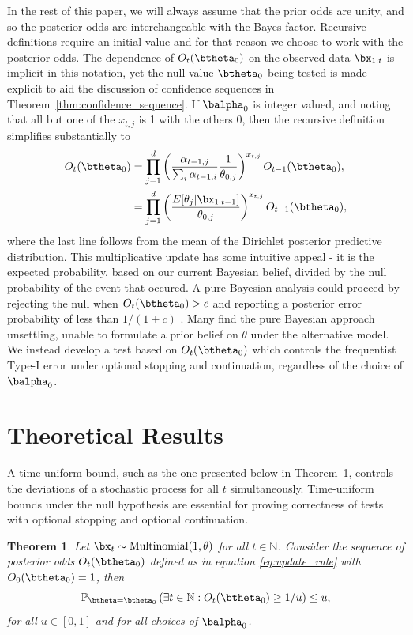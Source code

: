\documentclass[11pt]{article}
\newtheorem{thm}{Theorem}[section]
\begin{document}
In the rest of this paper, we will always assume that the prior odds are unity, and so the posterior odds are interchangeable with the Bayes factor.
Recursive definitions require an initial value and for that reason we choose to work with the posterior odds.
The dependence of $O_t(\btheta_0)$ on the observed data $\bx_{1:t}$ is implicit in this notation, yet the null value $\btheta_0$ being tested is made explicit to aid the discussion of confidence sequences in Theorem~\ref{thm:confidence_sequence}.
If $\balpha_0$ is integer valued, and noting that all but one of the $x_{t,j}$ is 1 with the others 0, then the recursive definition simplifies substantially to
\begin{align}
  \label{eq:simplified_bayes_factor}
  O_{t}(\btheta_0) &= \prod_{j=1}^{d} \left(\frac{\alpha_{t-1,j}}{\sum_i \alpha_{t-1,i}} \frac{1}{\theta_{0,j}}\right)^{x_{t,j}} O_{t-1}(\btheta_0),\\
  &=\prod_{j=1}^{d}\left(\frac{E[\theta_j|\bx_{1:t-1}]}{\theta_{0,j}} \right)^{x_{t,j}} O_{t-1}(\btheta_0),
\end{align}
where the last line follows from the mean of the Dirichlet posterior predictive distribution.
This multiplicative update has some intuitive appeal - it is the expected probability, based on our current Bayesian belief, divided by the null probability of the event that occured.
A pure Bayesian analysis could proceed by rejecting the null when $O_t(\btheta_0) > c$ and reporting a posterior error probability of less than $1/(1+c)$ \citep[Chapter 5]{bernardo}.
Many find the pure Bayesian approach unsettling, unable to formulate a prior belief on $\theta$ under the alternative model.
We instead develop a test based on $O_t(\btheta_0)$ which controls the frequentist Type-I error under optional stopping and continuation, regardless of the choice of $\balpha_0$.

\section{Theoretical Results}
\label{sec:theory}
A time-uniform bound, such as the one presented below in Theorem~\ref{thm:type_1_error}, controls the deviations of a stochastic process for all $t$ simultaneously.
Time-uniform bounds under the null hypothesis are essential for proving correctness of tests with optional stopping and optional continuation.
\begin{thm}  
  \label{thm:type_1_error}
  Let $\bx_t\sim \mathrm{Multinomial}(1,\theta)$ for all $t \in \mathbb{N}$.
Consider the sequence of posterior odds $O_t(\btheta_0)$ defined as in equation \eqref{eq:update_rule} with $O_0(\btheta_0)=1$, then
\begin{equation}
  \label{eq:type_1_error}
  \mathbb{P}_{\btheta = \btheta_0}\left( \exists t \in \mathbb{N}: O_t(\btheta_0) \geq 1/u \right) \leq u,
\end{equation}
for all $u \in [0,1]$ and for all choices of $\balpha_0$.
\end{thm}
\end{document}
